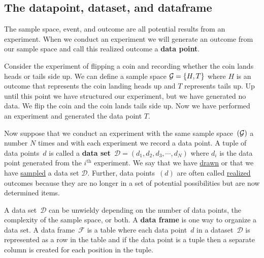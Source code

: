 \subsection{The datapoint, dataset, and dataframe}

The sample space, event, and outcome are all potential results from an experiment. 
When we conduct an experiment we will generate an outcome from our sample space and call this realized outcome a \textbf{data point}. 

\ex Consider the experiment of flipping a coin and recording whether the coin lands heads or tails side up.
We can define a sample space $\mathcal{G} = \{H,T\}$ where $H$ is an outcome that represents the coin landing heads up and $T$ represents tails up. Up until this point we have structured our experiment, but we have generated no data. We flip the coin and the coin lands tails side up. Now we have performed an experiment and generated the data point $T$.

Now suppose that we conduct an experiment with the same sample space~$(\mathcal{G})$ a number $N$ times and with each experiment we record a data point. A tuple of data points~$d$ is called a \textbf{data set}~$\mathcal{D} = (d_{1}, d_{2}, d_{3}, \cdots, d_{N})$ where $d_{i}$ is the data point generated from the $i^\text{th}$ experiment.
We say that we have \underline{drawn} or that we have \underline{sampled} a data set $\mathcal{D}$. Further, data points~$(d)$ are often called \underline{realized} outcomes because they are no longer in a set of potential possibilities but are now determined items. 

A data set~$\mathcal{D}$ can be unwieldy depending on the number of data points, the complexity of the sample space, or both.
A \textbf{data frame} is one way to organize a data set.
A data frame~$\mathcal{F}$ is a table where each data point~$d$ in a dataset~$\mathcal{D}$ is represented as a row in the table and if the data point is a tuple then a separate column is created for each position in the tuple.

